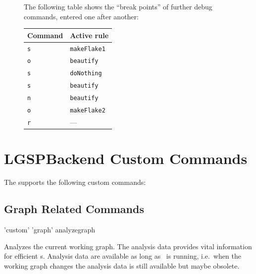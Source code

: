 \begin{figure}[htbp]
\begin{example}
\begin{center}
\end{center}
The following table shows the ``break points'' of further debug commands, entered one after another:
\begin{center}
  \begin{tabular}{|l|l|} \hline
    \textbf{Command} & \textbf{Active rule} \\ \hline
    \texttt{s} & \texttt{makeFlake1} \\
    \texttt{o} & \texttt{beautify} \\
    \texttt{s} & \texttt{doNothing} \\
    \texttt{s} & \texttt{beautify} \\ 
    \texttt{n} & \texttt{beautify} \\ 
    \texttt{o} & \texttt{makeFlake2} \\
    \texttt{r} & --- \\ \hline
  \end{tabular}
\end{center}
\end{example}   
\end{figure}


\section{LGSPBackend Custom Commands}
\label{custom}
The  supports the following custom commands:

\subsection{Graph Related Commands}
\begin{rail}
  'custom' 'graph' analyzegraph
\end{rail}
Analyzes the current working graph. The analysis data provides vital information for efficient s. Analysis data are available as long as \GrShell\ is running, i.e.\ when the working graph changes the analysis data is still available but maybe obsolete.


